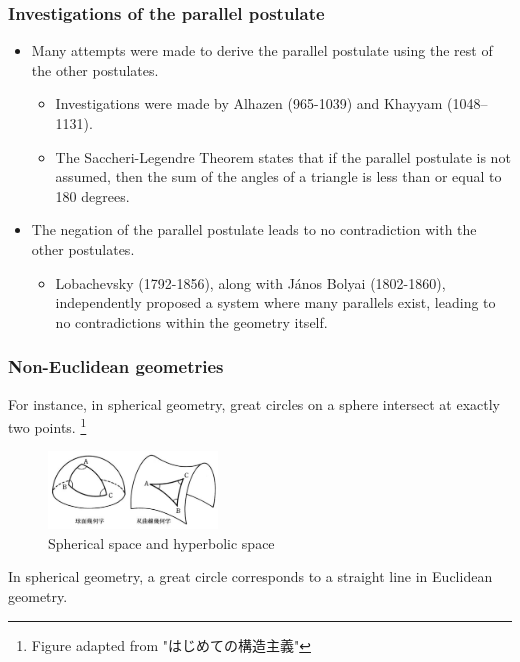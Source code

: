 \documentclass[unicode, 14pt, aspectratio=169]{beamer}
\newcommand\blfootnote[1]{%
  \begingroup
  \renewcommand\thefootnote{}\footnote{#1}%
  \addtocounter{footnote}{-1}%
  \endgroup
}
\begin{document}
\begin{frame}
  \frametitle{Investigations of the parallel postulate}
  \begin{itemize}
  \item Many attempts were made to derive the parallel postulate using the rest of the other postulates.
    \begin{itemize}
    \item Investigations were made by Alhazen (965-1039) and Khayyam (1048–1131).
    \item The Saccheri-Legendre Theorem states that if the parallel postulate is not assumed, then the sum of the angles of a triangle is less than or equal to 180 degrees.
    \end{itemize}
  \item The negation of the parallel postulate leads to no contradiction with the other postulates.
    \begin{itemize}
      \item Lobachevsky (1792-1856), along with János Bolyai (1802-1860), independently proposed a system where many parallels exist, leading to no contradictions within the geometry itself.
    \end{itemize}
  \end{itemize}
\end{frame}
\begin{frame}
  \frametitle{Non-Euclidean geometries}
  {\large For instance, in spherical geometry, great circles on a sphere intersect at exactly two points.}
  \blfootnote{Figure adapted from "はじめての構造主義"\supercite{structure}}
  \begin{figure}
    \includegraphics[width=0.4\textwidth]{images/non-euclid.png}
    \caption{Spherical space and hyperbolic space}
  \end{figure}
  In spherical geometry, a great circle corresponds to a straight line in Euclidean geometry.
\end{frame}
\end{document}
